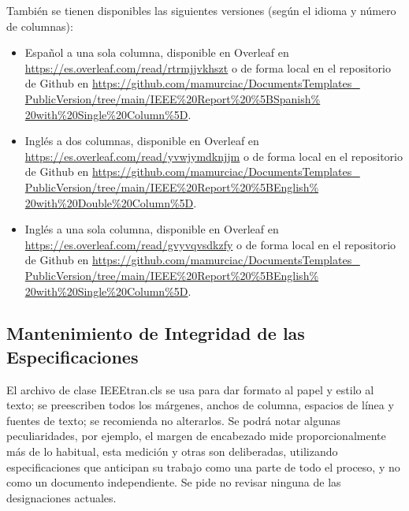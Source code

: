 \documentclass[letterpaper, 10pt, conference]{IEEEtran} %
\begin{document}
	También se tienen disponibles las siguientes versiones (según el idioma y número de columnas):
	\begin{itemize}
		\item Español a una sola columna, disponible en Overleaf en \href{https://es.overleaf.com/read/rtrmjjvkhszt}{https://es.overleaf.com/read/rtrmjjvkhszt} o de forma local en el repositorio de Github en \href{https://github.com/mamurciac/DocumentsTemplates_PublicVersion/tree/main/IEEE%20Report%20%5BSpanish%20with%20Single%20Column%5D}{https://github.com/mamurciac/DocumentsTemplates\_ PublicVersion/tree/main/IEEE\%20Report\%20\%5BSpanish\% 20with\%20Single\%20Column\%5D}.
		\item Inglés a dos columnas, disponible en Overleaf en \href{https://es.overleaf.com/read/yvwjymdknjjm}{https://es.overleaf.com/read/yvwjymdknjjm} o de forma local en el repositorio de Github en \href{https://github.com/mamurciac/DocumentsTemplates_PublicVersion/tree/main/IEEE%20Report%20%5BEnglish%20with%20Double%20Column%5D}{https://github.com/mamurciac/DocumentsTemplates\_ PublicVersion/tree/main/IEEE\%20Report\%20\%5BEnglish\% 20with\%20Double\%20Column\%5D}.
		\item Inglés a una sola columna, disponible en Overleaf en \href{https://es.overleaf.com/read/gvyvqvsdkzfy}{https://es.overleaf.com/read/gvyvqvsdkzfy} o de forma local en el repositorio de Github en \href{https://github.com/mamurciac/DocumentsTemplates_PublicVersion/tree/main/IEEE%20Report%20%5BEnglish%20with%20Single%20Column%5D}{https://github.com/mamurciac/DocumentsTemplates\_ PublicVersion/tree/main/IEEE\%20Report\%20\%5BEnglish\% 20with\%20Single\%20Column\%5D}.
	\end{itemize}
	
	\subsection{Mantenimiento de Integridad de las Especificaciones} \label{subseccionMantenimientoDeIntegridadDeLasEspecificaciones}
	El archivo de clase IEEEtran.cls se usa para dar formato al papel y estilo al texto; se preescriben todos los márgenes, anchos de columna, espacios de línea y fuentes de texto; se recomienda no alterarlos. Se podrá notar algunas peculiaridades, por ejemplo, el margen de encabezado mide proporcionalmente más de lo habitual, esta medición y otras son deliberadas, utilizando especificaciones que anticipan su trabajo como una parte de todo el proceso, y no como un documento independiente. Se pide no revisar ninguna de las designaciones actuales.
	
\end{document}
